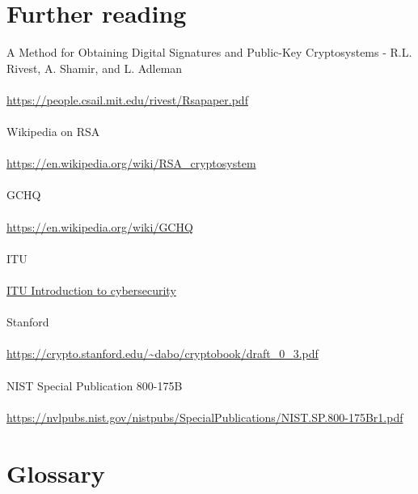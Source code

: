 \documentclass[11pt]{article}   	%
\begin{document}
\break


\section*{Further reading}

A Method for Obtaining Digital Signatures and Public-Key Cryptosystems - R.L. Rivest, A. Shamir, and L. Adleman \\
\\
\url{https://people.csail.mit.edu/rivest/Rsapaper.pdf} \\
\\
Wikipedia on RSA \\
\\
\url{https://en.wikipedia.org/wiki/RSA_cryptosystem} \\
\\
GCHQ \\
\\
\url{https://en.wikipedia.org/wiki/GCHQ} \\
\\
ITU \\
\\
\href{https://www.itu.int/en/ITU-D/Cybersecurity/Documents/01-Introduction%20to%20Cryptography.pdf}{ITU Introduction to cybersecurity} \\
\\
Stanford \\
\\
\url{https://crypto.stanford.edu/~dabo/cryptobook/draft_0_3.pdf} \\
\\
NIST Special Publication 800-175B \\
\\
\url{https://nvlpubs.nist.gov/nistpubs/SpecialPublications/NIST.SP.800-175Br1.pdf}

\break


\section*{Glossary}
\end{document}
